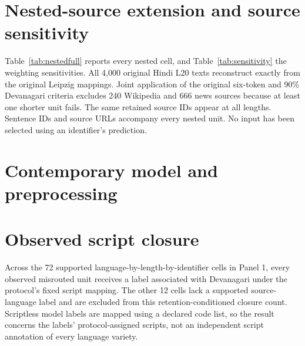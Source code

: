 \documentclass[final]{clv2025}
\newcommand{\fitexhibit}[1]{\sbox{\exhibitbox}{}\ifdim\wd\exhibitbox>\linewidth\resizebox{\linewidth}{!}{\usebox{\exhibitbox}}\else\usebox{\exhibitbox}\fi}
\newcommand{\exhibit}[1]{\fitexhibit{tables/#1.tex}}
\begin{document}
\FloatBarrier
\section{Nested-source extension and source sensitivity}\label{app:nested}

\begin{table}[htbp]\centering\small\exhibit{nested_summary}
\caption{Nested Hindi sampled-source units. The sources are identical across lengths within each collection. OL3 denotes OpenLID-v3 with common or recommended (rec.) preprocessing. Intervals for the L20-minus-L1 difference use paired source resampling.}\label{tab:nestedfull}
\end{table}

Table~\ref{tab:nestedfull} reports every nested cell, and Table~\ref{tab:sensitivity} the weighting sensitivities. All 4{,}000 original Hindi L20 texts reconstruct exactly from the original Leipzig mappings. Joint application of the original six-token and 90\% Devanagari criteria excludes 240 Wikipedia and 666 news sources because at least one shorter unit fails. The same retained source IDs appear at all lengths. Sentence IDs and source URLs accompany every nested unit. No input has been selected using an identifier's prediction.

\begin{table}[htbp]\centering\small\exhibit{source_sensitivity}
\caption{GlotLID v3 sensitivity to weighting and the largest recovered source cluster in the original Hindi cells. These are distinct conditional summaries, not population corrections.}\label{tab:sensitivity}
\end{table}

\FloatBarrier
\section{Contemporary model and preprocessing}\label{app:modern}


\FloatBarrier
\section{Observed script closure}

Across the 72 supported language-by-length-by-identifier cells in Panel 1, every observed misrouted unit receives a label associated with Devanagari under the protocol's fixed script mapping. The other 12 cells lack a supported source-language label and are excluded from this retention-conditioned closure count. Scriptless model labels are mapped using a declared code list, so the result concerns the labels' protocol-assigned scripts, not an independent script annotation of every language variety.
\end{document}
